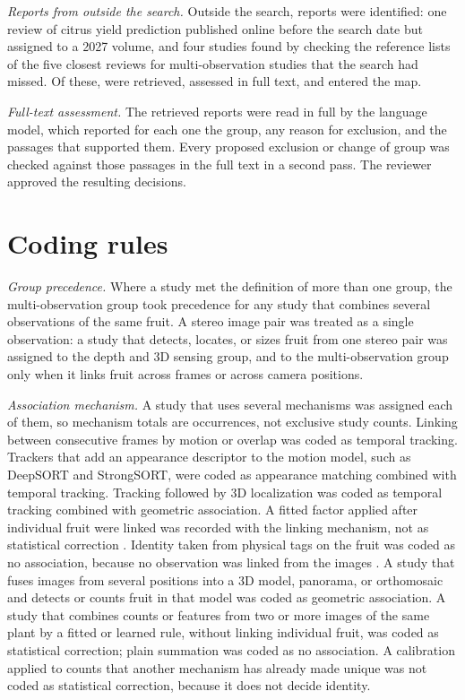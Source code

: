 \documentclass[a4paper,11pt]{article}
\begin{document}
\textit{Reports from outside the search.} Outside the search, \nOther reports were identified: one review of citrus yield prediction published online before the search date but assigned to a 2027 volume, and four studies found by checking the reference lists of the five closest reviews for multi-observation studies that the search had missed. Of these, \nOtherRetrieved were retrieved, assessed in full text, and entered the map.

\textit{Full-text assessment.} The \nFTAssessed retrieved reports were read in full by the language model, which reported for each one the group, any reason for exclusion, and the passages that supported them. Every proposed exclusion or change of group was checked against those passages in the full text in a second pass. The reviewer approved the resulting decisions.

\section{Coding rules}\label{sup:coding}

\textit{Group precedence.} Where a study met the definition of more than one group, the multi-observation group took precedence for any study that combines several observations of the same fruit. A stereo image pair was treated as a single observation: a study that detects, locates, or sizes fruit from one stereo pair was assigned to the depth and 3D sensing group, and to the multi-observation group only when it links fruit across frames or across camera positions.

\textit{Association mechanism.} A study that uses several mechanisms was assigned each of them, so mechanism totals are occurrences, not exclusive study counts. Linking between consecutive frames by motion or overlap was coded as temporal tracking. Trackers that add an appearance descriptor to the motion model, such as DeepSORT and StrongSORT, were coded as appearance matching combined with temporal tracking. Tracking followed by 3D localization was coded as temporal tracking combined with geometric association. A fitted factor applied after individual fruit were linked was recorded with the linking mechanism, not as statistical correction \citep{nuske2014modeling,wang2013automated}. Identity taken from physical tags on the fruit was coded as no association, because no observation was linked from the images \citep{kassim2012oil}. A study that fuses images from several positions into a 3D model, panorama, or orthomosaic and detects or counts fruit in that model was coded as geometric association. A study that combines counts or features from two or more images of the same plant by a fitted or learned rule, without linking individual fruit, was coded as statistical correction; plain summation was coded as no association. A calibration applied to counts that another mechanism has already made unique was not coded as statistical correction, because it does not decide identity.
\end{document}
